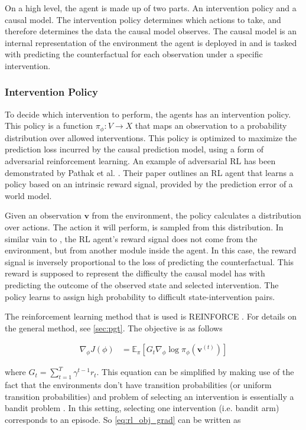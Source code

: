 \documentclass{article}
\begin{document}
On a high level, the agent is made up of two parts. An intervention policy and a causal model. The intervention policy determines which actions to take, and therefore determines the data the causal model observes. The causal model is an internal representation of the environment the agent is deployed in and is tasked with predicting the counterfactual for each observation under a specific intervention.

\subsubsection{Intervention Policy}

To decide which intervention to perform, the agents has an intervention policy. This policy is a function $\pi_\phi : V \rightarrow X$ that maps an observation to a probability distribution over allowed interventions. This policy is optimized to maximize the prediction loss incurred by the causal prediction model, using a form of adversarial reinforcement learning. An example of adversarial RL has been demonstrated by Pathak et al. \cite{pathak2017curiosity}. Their paper outlines an RL agent that learns a policy based on an intrinsic reward signal, provided by the prediction error of a world model.

Given an observation $\mathbf{v}$  from the environment, the policy calculates a distribution over actions. The action it will perform, is sampled from this distribution. In similar vain to \cite{pathak2017curiosity}, the RL agent's reward signal does not come from the environment, but from another module inside the agent. In this case, the reward signal is inversely proportional to the loss of predicting the counterfactual. This reward is supposed to represent the difficulty the causal model has with predicting the outcome of the observed state and selected intervention. The policy learns to assign high probability to difficult state-intervention pairs.

The reinforcement learning method that is used is REINFORCE \cite{sutton2000policy}. For details on the general method, see \autoref{sec:pgt}. The objective is as follows


\begin{align}
    \nabla_\phi J(\phi) &= \mathbb{E}_\pi \left[
    G_t \nabla_\phi\log\pi_\phi(\mathbf{v}^{(t)}) \right]\label{eq:rl_obj_grad}
\end{align}

where $G_t = \sum_{t=1}^T \gamma^{t-1} r_t$. This equation can be simplified by making use of the fact that the environments don't have transition probabilities (or uniform transition probabilities) and problem of selecting an intervention is essentially a bandit problem \cite{sutton2018reinforcement}. In this setting, selecting one intervention (i.e. bandit arm) corresponds to an episode. So \autoref{eq:rl_obj_grad} can be written as
\end{document}
